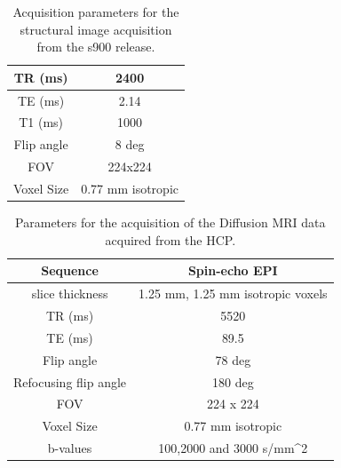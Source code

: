 \documentclass[msthesis.tex]{subfiles}
\begin{document}
\begin{table}[]
    \centering
    \begin{tabular}{|c|c|}
    \hline
         TR (ms) & 2400  \\
    \hline
         TE (ms) & 2.14 \\
    \hline
         T1 (ms) & 1000 \\
    \hline
         Flip angle & 8 deg \\
    \hline
         FOV & 224x224 \\
    \hline
         Voxel Size & 0.77 mm isotropic \\
    \hline
    \end{tabular}
    \caption{Acquisition parameters for the structural image acquisition from the s900 release. }
    \label{tab:structuralmri}
\end{table}

\begin{table}[]
\centering
    \begin{tabular}{|c|c|}
         \hline
         Sequence &  Spin-echo EPI \\
         \hline
         slice thickness & 1.25 mm, 1.25 mm isotropic voxels\\
          \hline
         TR (ms) & 5520  \\
          \hline
         TE (ms) & 89.5 \\
          \hline
         Flip angle & 78 deg \\
          \hline
         Refocusing flip angle & 180 deg \\
          \hline
         FOV & 224 x 224 \\
          \hline
        Voxel Size & 0.77 mm isotropic \\
          \hline
        b-values & 100,2000 and 3000 s/mm^2\\
         \hline
    \end{tabular}
    \caption{Parameters for the acquisition of the Diffusion MRI data acquired from the HCP.}
    \label{tab:diffusionmripara}
\end{table}
\end{document}
